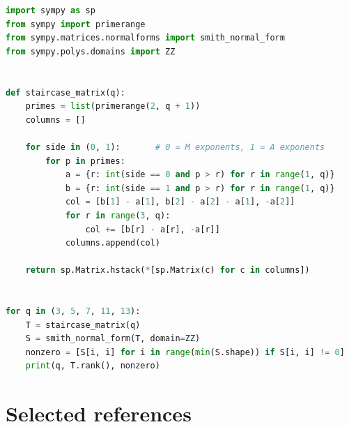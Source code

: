 \documentclass[11pt]{article}
\theoremstyle{definition}
\theoremstyle{remark}
\begin{document}
\begin{lstlisting}[language=Python]
import sympy as sp
from sympy import primerange
from sympy.matrices.normalforms import smith_normal_form
from sympy.polys.domains import ZZ


def staircase_matrix(q):
    primes = list(primerange(2, q + 1))
    columns = []

    for side in (0, 1):       # 0 = M exponents, 1 = A exponents
        for p in primes:
            a = {r: int(side == 0 and p > r) for r in range(1, q)}
            b = {r: int(side == 1 and p > r) for r in range(1, q)}
            col = [b[1] - a[1], b[2] - a[2] - a[1], -a[2]]
            for r in range(3, q):
                col += [b[r] - a[r], -a[r]]
            columns.append(col)

    return sp.Matrix.hstack(*[sp.Matrix(c) for c in columns])


for q in (3, 5, 7, 11, 13):
    T = staircase_matrix(q)
    S = smith_normal_form(T, domain=ZZ)
    nonzero = [S[i, i] for i in range(min(S.shape)) if S[i, i] != 0]
    print(q, T.rank(), nonzero)
\end{lstlisting}

\section{Selected references}
\end{document}
